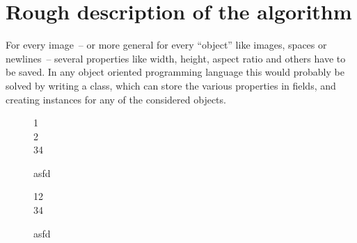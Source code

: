 \documentclass[version=3.12,american]{scrartcl}
\begin{document}
\section{Rough description of the algorithm}
For every image~-- or more general for every ``object'' like  images, spaces or newlines~-- several properties like width, height, aspect ratio and others have to be saved. In any object oriented programming language this would probably be solved by writing a class, which can store the various properties in fields, and creating instances for any of the considered objects.

\begin{figure}
\begin{subfiglist}[cs=0pt,ew=200pt,cfw=10pt]{{1\\2\\3}4}
\end{subfiglist}
\caption{asfd}
\end{figure}

\begin{figure}
\begin{subfiglist}[cs=0pt,uh=true,ew=200pt]{12\\34}%
\end{subfiglist}
\caption{asfd}
\end{figure}
\end{document}
